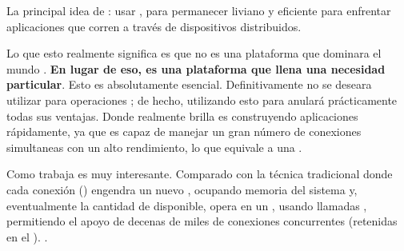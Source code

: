 
La principal idea de \nodejsNAME : usar \nonbloking, \eventdrivenPL {} para permanecer liviano y eficiente para enfrentar aplicaciones \dataintensive \realTimeINT que corren a través de dispositivos distribuidos.


Lo que esto realmente significa es que \nodejsNAME no es una plataforma \panaceaCPT que dominara el mundo \webINT \developmentPC. \textbf{En lugar de eso, es una plataforma que llena una necesidad particular}. Esto es absolutamente esencial. Definitivamente no se deseara utilizar \nodejsNAME para operaciones \cpuIntensivePC; de hecho, utilizando esto para \heavyComputationPC anulará prácticamente todas sus ventajas. Donde \nodejsNAME realmente brilla es construyendo aplicaciones \scalableQA  \networkINT rápidamente, ya que es capaz de manejar un gran número de conexiones simultaneas con un alto rendimiento, lo que equivale a una \highScalabilityDB.

Como trabaja \underTheHoodCPT es muy interesante. Comparado con la técnica tradicional \webServingINT donde cada conexión (\requestINT) engendra un nuevo \threadPL, ocupando memoria \memoryRamPC del sistema y, eventualmente \maxingOutCPT la cantidad de \memoryRamPC disponible, \nodejsNAME opera en un \singleThreadPL, usando llamadas \nonbloking {}, permitiendo el apoyo de decenas de miles de conexiones concurrentes (retenidas en el \eventloopCPT). .



